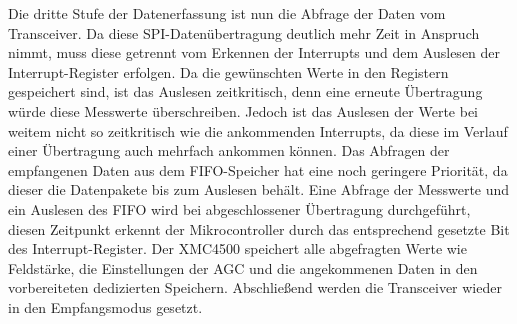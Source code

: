 Die dritte Stufe  der Datenerfassung ist nun die Abfrage der Daten vom Transceiver. Da diese \ac{SPI}-Datenübertragung deutlich mehr Zeit in Anspruch nimmt, muss diese getrennt vom Erkennen der Interrupts und dem Auslesen der Interrupt-Register erfolgen. Da die gewünschten Werte in den Registern gespeichert sind, ist das Auslesen zeitkritisch, denn eine erneute Übertragung würde diese Messwerte überschreiben. Jedoch ist das Auslesen der Werte bei weitem nicht so zeitkritisch wie die ankommenden Interrupts, da diese im Verlauf einer Übertragung auch mehrfach ankommen können. Das Abfragen der empfangenen Daten aus dem \ac{FIFO}-Speicher hat eine noch geringere Priorität, da dieser die Datenpakete bis zum Auslesen behält. Eine Abfrage der Messwerte und ein Auslesen des \ac{FIFO} wird bei abgeschlossener Übertragung durchgeführt, diesen Zeitpunkt erkennt der Mikrocontroller durch das entsprechend gesetzte Bit des Interrupt-Register. Der XMC4500 speichert alle abgefragten Werte wie Feldstärke, die Einstellungen der \ac{AGC} und die angekommenen Daten in den vorbereiteten dedizierten Speichern. Abschließend werden die Transceiver wieder in den Empfangsmodus gesetzt. 

